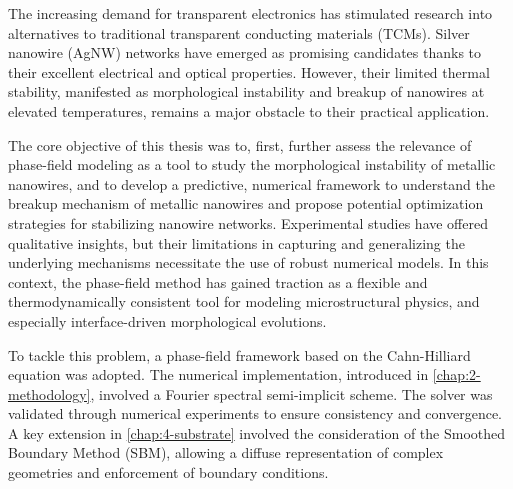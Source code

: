 The increasing demand for transparent electronics has stimulated research into alternatives to traditional transparent conducting materials (TCMs). Silver nanowire (AgNW) networks have emerged as promising candidates thanks to their excellent electrical and optical properties. However, their limited thermal stability, manifested as morphological instability and breakup of nanowires at elevated temperatures, remains a major obstacle to their practical application.

The core objective of this thesis was to, first, further assess the relevance of phase-field modeling as a tool to study the morphological instability of metallic nanowires, and to develop a predictive, numerical framework to understand the breakup mechanism of metallic nanowires and propose potential optimization strategies for stabilizing nanowire networks. Experimental studies have offered qualitative insights, but their limitations in capturing and generalizing the underlying mechanisms necessitate the use of robust numerical models. In this context, the phase-field method has gained traction as a flexible and thermodynamically consistent tool for modeling microstructural physics, and especially interface-driven morphological evolutions.

To tackle this problem, a phase-field framework based on the Cahn-Hilliard equation was adopted. The numerical implementation, introduced in \autoref{chap:2-methodology}, involved a Fourier spectral semi-implicit scheme. The solver was validated through numerical experiments to ensure consistency and convergence. A key extension in \autoref{chap:4-substrate} involved the consideration of the Smoothed Boundary Method (SBM), allowing a diffuse representation of complex geometries and enforcement of boundary conditions.

